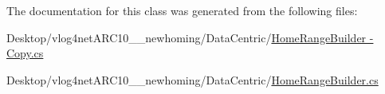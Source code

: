 The documentation for this class was generated from the following files\-:\begin{DoxyCompactItemize}
\item 
Desktop/vlog4net\-A\-R\-C10\-\_\-\_\-newhoming/\-Data\-Centric/\hyperlink{_home_range_builder_01-_01_copy_8cs}{Home\-Range\-Builder -\/ Copy.\-cs}\item 
Desktop/vlog4net\-A\-R\-C10\-\_\-\_\-newhoming/\-Data\-Centric/\hyperlink{_home_range_builder_8cs}{Home\-Range\-Builder.\-cs}\end{DoxyCompactItemize}
